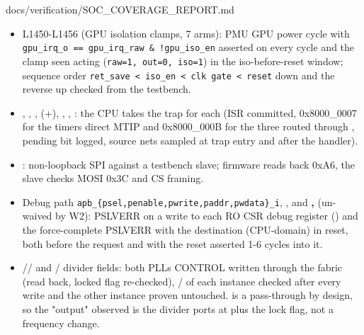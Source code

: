 \begin{relocated}{docs/verification/SOC_COVERAGE_REPORT.md}
\begin{itemize}
\tightlist
\item
   L1450-L1456 (GPU isolation clamps, 7
   arms): PMU GPU power cycle with
  \texttt{gpu\_\allowbreak{}irq\_\allowbreak{}o\ =\allowbreak{}=\allowbreak{}\ gpu\_\allowbreak{}irq\_\allowbreak{}raw\ \&\ !gpu\_\allowbreak{}iso\_\allowbreak{}en}
  asserted on every cycle and the clamp seen acting
  (\texttt{raw=\allowbreak{}1,\allowbreak{}\ out=\allowbreak{}0,\allowbreak{}\ iso=\allowbreak{}1})
  in the iso-before-reset window; sequence order
  \texttt{ret\_\allowbreak{}save\ <\ iso\_\allowbreak{}en\ <\ clk\ gate\ <\ reset}
  down and the reverse up checked from the testbench.
\item
  , ,
  ,  (+),
  , , : the CPU takes the
  trap for each (ISR committed,  0x8000\_\allowbreak{}0007
  for the timer\textquotesingle s direct MTIP and
  0x8000\_\allowbreak{}000B for the three routed through
  , pending bit logged, source nets sampled
  at trap entry and after the handler).
\item
  : non-loopback SPI against a testbench slave;
  firmware reads back 0xA6, the slave checks MOSI 0x3C and CS framing.
\item
  Debug path
  \texttt{apb\_\allowbreak{}\{psel,\allowbreak{}penable,\allowbreak{}pwrite,\allowbreak{}paddr,\allowbreak{}pwdata\}\_\allowbreak{}i},
  , and \textbf{,
  } (un-waived by  W2): PSLVERR on a
  write to each RO CSR debug register ()
  and the  force-complete PSLVERR with the
  destination (CPU-domain) in reset, both before the request and with
  the reset asserted 1-6 cycles into it.
\item
  // and
  / divider fields: both
  PLLs\textquotesingle{} CONTROL written through the fabric (read back,
  locked flag re-checked), / of each
  instance checked after every write and the other instance proven
  untouched.  is a pass-through by design, so the
  "output" observed is the divider ports at  plus the
  lock flag, not a frequency change.
\end{itemize}


\end{relocated}
